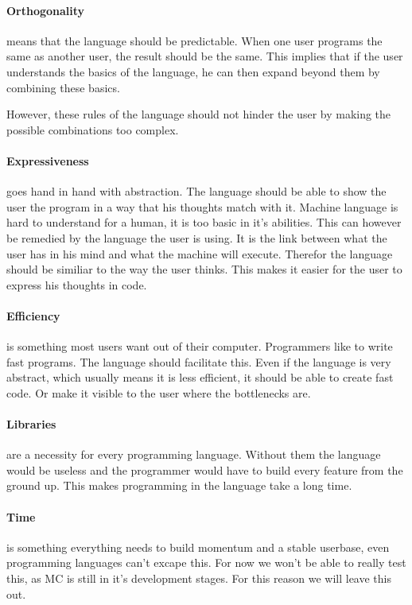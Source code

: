 \begin{multicols}{2}
\paragraph{Orthogonality}
means that the language should be predictable. When one user programs the same as another user, the result should be the same. This implies that if the user understands the basics of the language, he can then expand beyond them by combining these basics.

However, these rules of the language should not hinder the user by making the possible combinations too complex.

\paragraph{Expressiveness}
goes hand in hand with abstraction. The language should be able to show the user the program in a way that his thoughts match with it. Machine language is hard to understand for a human, it is too basic in it's abilities. This can however be remedied by the language the user is using. It is the link between what the user has in his mind and what the machine will execute. Therefor the language should be similiar to the way the user thinks. This makes it easier for the user to express his thoughts in code.

\paragraph{Efficiency}
is something most users want out of their computer. Programmers like to write fast programs. The language should facilitate this. Even if the language is very abstract, which usually means it is less efficient\cite{}, it should be able to create fast code. Or make it visible to the user where the bottlenecks are.

\paragraph{Libraries}
are a necessity for every programming language. Without them the language would be useless and the programmer would have to build every feature from the ground up. This makes programming in the language take a long time.

\paragraph{Time}
is something everything needs to build momentum and a stable userbase, even programming languages can't excape this. For now we won't be able to really test this, as MC is still in it's development stages. For this reason we will leave this out.


\end{multicols}
